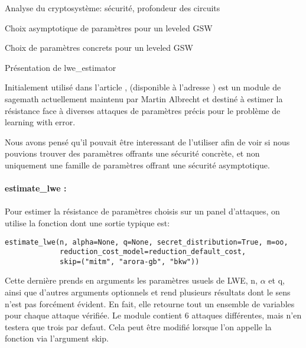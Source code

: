 \begin{section}{Analyse du cryptosystème: sécurité, profondeur des circuits}
\begin{subsection}{Choix asymptotique de paramètres pour un leveled GSW}
	\end{subsection}

	\begin{subsection}{Choix de paramètres concrets pour un leveled GSW}
	\begin{subsubsection}{Présentation de lwe\_estimator}
	
	Initialement utilisé dans l'article
	\cite{EPRINT:AlbPlaSco15},
	(disponible à l'adresse \cite{estimator}) est un module de sagemath actuellement maintenu par
Martin Albrecht et 
	destiné à estimer la résistance face à diverses attaques de paramètres précis pour
	le problème de learning with error.

	Nous avons pensé qu'il pouvait être interessant de l'utiliser afin de
	voir si nous pouvions trouver des paramètres offrants une sécurité
	concrète, et non uniquement une famille de paramètres offrant une
	sécurité asymptotique.
	
	
	\paragraph{}
	\textbf{estimate\_lwe :}

	\paragraph{}
	Pour estimer la résistance de paramètres choisis sur un panel
	d'attaques, on utilise la fonction  dont une sortie
	typique est:
	
	\flushleft
	
	\begin{lstlisting}
estimate_lwe(n, alpha=None, q=None, secret_distribution=True, m=oo,
             reduction_cost_model=reduction_default_cost,
             skip=("mitm", "arora-gb", "bkw"))
        \end{lstlisting}
	
	\flushleft
	
	Cette dernière prends en arguments les paramètres usuels de LWE, n, $\alpha$ et q, ainsi que d'autres arguments optionnels et rend plusieurs résultats dont le sens n'est pas forcément évident.
	En fait, elle retourne tout un ensemble de variables pour chaque attaque vérifiée. Le module
	contient 6 attaques différentes, mais n'en testera que trois par defaut. Cela peut être modifié
	lorsque l'on appelle la fonction  via l'argument skip.
	
	\flushleft
	

\end{subsubsection}
\end{subsection}
\end{section}
